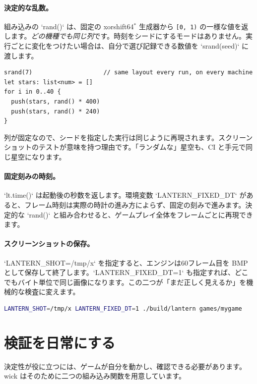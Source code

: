 \paragraph{決定的な乱数。} 組み込みの `rand()` は、固定の \mbox{xorshift64$^{*}$} 生成器から \texttt{[0, 1)} の一様な値を返します。\emph{どの機種でも同じ列}です。時刻をシードにするモードはありません。実行ごとに変化をつけたい場合は、自分で選び記録できる数値を `srand(seed)` に渡します。

\begin{lstlisting}[language=wick]
srand(7)                    // same layout every run, on every machine
let stars: list<num> = []
for i in 0..40 {
  push(stars, rand() * 400)
  push(stars, rand() * 240)
}
\end{lstlisting}

\noindent
列が固定なので、シードを指定した実行は同じように再現されます。スクリーンショットのテストが意味を持つ理由です。「ランダムな」星空も、CI と手元で同じ星空になります。

\paragraph{固定刻みの時刻。} `lt.time()` は起動後の秒数を返します。環境変数 `LANTERN_FIXED_DT` があると、フレーム時刻は実際の時計の進み方によらず、固定の刻みで進みます。決定的な `rand()` と組み合わせると、ゲームプレイ全体をフレームごとに再現できます。

\paragraph{スクリーンショットの保存。} `LANTERN_SHOT=/tmp/x` を指定すると、エンジンは60フレーム目を BMP として保存して終了します。`LANTERN_FIXED_DT=1` も指定すれば、どこでもバイト単位で同じ画像になります。この二つが「まだ正しく見えるか」を機械的な検査に変えます。

\begin{lstlisting}[language=bash,basicstyle=\ttfamily\small,keywordstyle={}]
LANTERN_SHOT=/tmp/x LANTERN_FIXED_DT=1 ./build/lantern games/mygame
\end{lstlisting}

\section{検証を日常にする}

決定性が役に立つには、ゲームが自分を動かし、確認できる必要があります。wick はそのために二つの組み込み関数を用意しています。

